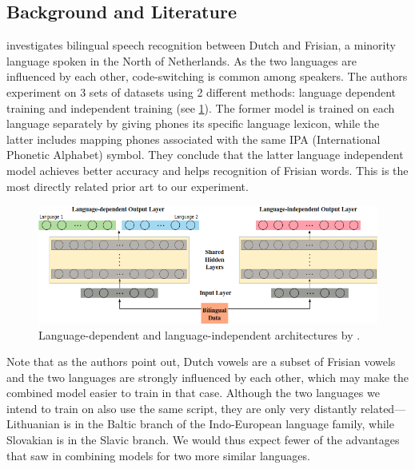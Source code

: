 \documentclass{article}
\begin{document}
  \subsection{Background and Literature} \label{literature}
  \cite{Yilmaz} investigates bilingual speech recognition between Dutch and Frisian, a minority language spoken in the North of Netherlands. As the two languages are influenced by each other, code-switching is common among speakers. The authors experiment on 3 sets of datasets using 2 different methods: language dependent training and independent training (see \ref{diagram yilmaz}). The former model is trained on each language separately by giving phones its specific language lexicon, while the latter includes mapping phones associated with the same IPA (International Phonetic Alphabet) symbol. They conclude that the latter language independent model achieves better accuracy and helps recognition of Frisian words. This is the most directly related prior art to our experiment.
  \begin{figure}[H]
    \includegraphics[width=\textwidth]{images/diagram-yilmaz}
    \caption{Language-dependent and language-independent architectures by \cite{Yilmaz}.}
    \label{diagram yilmaz}
  \end{figure}
  Note that as the authors point out, Dutch vowels are a subset of Frisian vowels and the two languages are strongly influenced by each other, which may make the combined model easier to train in that case. Although the two languages we intend to train on also use the same script, they are only very distantly related---Lithuanian is in the Baltic branch of the Indo-European language family, while Slovakian is in the Slavic branch. We would thus expect fewer of the advantages that \cite{Yilmaz} saw in combining models for two more similar languages.
  
\end{document}
